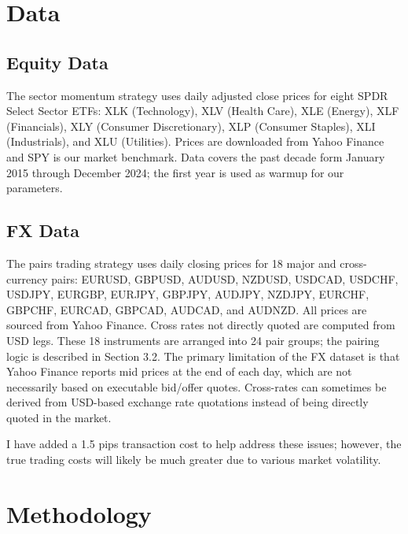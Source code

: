 \documentclass[12pt]{article}
\begin{document}
\section{Data}

\subsection{Equity Data}

The sector momentum strategy uses daily adjusted close prices for eight SPDR Select Sector ETFs: XLK (Technology), XLV (Health Care), XLE (Energy), XLF (Financials), XLY (Consumer Discretionary), XLP (Consumer Staples), XLI (Industrials), and XLU (Utilities). Prices are downloaded from Yahoo Finance and SPY is our market benchmark. Data covers the past decade form January 2015 through December 2024; the first year is used as warmup for our parameters.

\subsection{FX Data}

The pairs trading strategy uses daily closing prices for 18 major and cross-currency pairs: EURUSD, GBPUSD, AUDUSD, NZDUSD, USDCAD, USDCHF, USDJPY, EURGBP, EURJPY, GBPJPY, AUDJPY, NZDJPY, EURCHF, GBPCHF, EURCAD, GBPCAD, AUDCAD, and AUDNZD. All prices are sourced from Yahoo Finance. Cross rates not directly quoted are computed from USD legs. These 18 instruments are arranged into 24 pair groups; the pairing logic is described in Section 3.2. The primary limitation of the FX dataset is that Yahoo Finance reports mid prices at the end of each day, which are not necessarily based on executable bid/offer quotes. Cross-rates can sometimes be derived from USD-based exchange rate quotations instead of being directly quoted in the market. 

I have added a 1.5 pips transaction cost to help address these issues; however, the true trading costs will likely be much greater due to various market volatility.

\section{Methodology}
\end{document}
